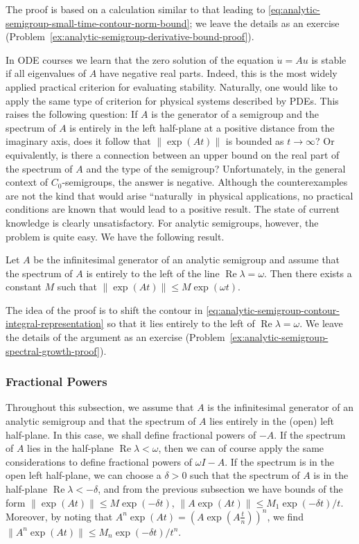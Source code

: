 The proof is based on a calculation similar to that leading to \eqref{eq:analytic-semigroup-small-time-contour-norm-bound}; we leave the details as an exercise (Problem~\ref{ex:analytic-semigroup-derivative-bound-proof}).

In ODE courses we learn that the zero solution of the equation $\dot u=Au$ is stable if all eigenvalues of $A$ have negative real parts. Indeed, this is the most widely applied practical criterion for evaluating stability. Naturally, one would like to apply the same type of criterion for physical systems described by PDEs. This raises the following question: If $A$ is the generator of a semigroup and the spectrum of $A$ is entirely in the left half-plane at a positive distance from the imaginary axis, does it follow that $\|\exp(At)\|$ is bounded as $t\to\infty$? Or equivalently, is there a connection between an upper bound on the real part of the spectrum of $A$ and the type of the semigroup? Unfortunately, in the general context of $C_0$-semigroups, the answer is negative. Although the counterexamples are not the kind that would arise ``naturally\textquotesingle\textquotesingle\ in physical applications, no practical conditions are known that would lead to a positive result. The state of current knowledge is clearly unsatisfactory. For analytic semigroups, however, the problem is quite easy. We have the following result.

\begin{Theorem}
\label{thm:analytic-semigroup-spectrum-controls-growth}
Let $A$ be the infinitesimal generator of an analytic semigroup and assume that the spectrum of $A$ is entirely to the left of the line $\operatorname{Re}\lambda=\omega$. Then there exists a constant $M$ such that $\|\exp(At)\|\leq M\exp(\omega t)$.
\end{Theorem}

The idea of the proof is to shift the contour in \eqref{eq:analytic-semigroup-contour-integral-representation} so that it lies entirely to the left of $\operatorname{Re}\lambda=\omega$. We leave the details of the argument as an exercise (Problem~\ref{ex:analytic-semigroup-spectral-growth-proof}).

\subsubsection{Fractional Powers}\label{subsec:analytic-generator-fractional-powers}

Throughout this subsection, we assume that $A$ is the infinitesimal generator of an analytic semigroup and that the spectrum of $A$ lies entirely in the (open) left half-plane. In this case, we shall define fractional powers of $-A$. If the spectrum of $A$ lies in the half-plane $\operatorname{Re}\lambda<\omega$, then we can of course apply the same considerations to define fractional powers of $\omega I-A$. If the spectrum is in the open left half-plane, we can choose a $\delta>0$ such that the spectrum of $A$ is in the half-plane $\operatorname{Re}\lambda<-\delta$, and from the previous subsection we have bounds of the form $\|\exp(At)\|\leq M\exp(-\delta t)$, $\|A\exp(At)\|\leq M_1\exp(-\delta t)/t$. Moreover, by noting that $A^n\exp(At)=(A\exp(A\frac{t}{n}))^n$, we find $\|A^n\exp(At)\|\leq M_n\exp(-\delta t)/t^n$.


